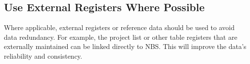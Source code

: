 \subsection{Use External Registers Where Possible}
Where applicable, external registers or reference data should be used to avoid data redundancy. For example, the project list or other table registers that are externally maintained can be linked directly to NBS. This will improve the data's reliability and consistency.

\newpage